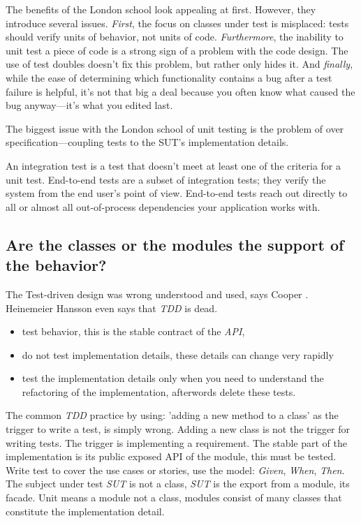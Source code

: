 \documentclass{article}
\begin{document}
The benefits of the London school look appealing at first. However, they introduce several issues. \textit{First}, the focus on classes under test is misplaced: tests should verify units of behavior, not units of code. \textit{Furthermore}, the inability to unit test a piece of code is a strong sign of a problem with the code design. The use of test doubles doesn’t fix this problem, but rather only hides it. And \textit{finally}, while the ease of determining which functionality contains a bug after a test failure is helpful, it’s not that big a deal because you often know what caused the bug anyway—it’s what you edited last.

The biggest issue with the London school of unit testing is the problem of over specification—coupling tests to the SUT’s implementation details.

An integration test is a test that doesn’t meet at least one of the criteria for a unit test. End-to-end tests are a subset of integration tests; they verify the system from the end user’s point of view. End-to-end tests reach out directly to all or almost all out-of-process dependencies your application works with.


\subsection{Are the classes or the modules the support of the behavior?}

The Test-driven design \cite{beck2002driven} was wrong understood and used, says Cooper \cite{WEBSITE:WhereDidItAllGoWrong}. Heinemeier Hansson \cite{WEBSITE:TDDisdead} even says that \textit{TDD} is dead.

\begin{itemize}
	\item test behavior, this is the stable contract of the \textit{API}, 
	\item do not test implementation details, these details can change very rapidly
	\item test the implementation details only when you need to understand the refactoring of the implementation, afterwords delete these tests.
\end{itemize}

The common \textit{TDD} practice by using: 'adding a new method to a class' as the trigger to write a test, is simply wrong. Adding a new class is not the trigger for writing tests. The trigger is implementing a requirement.
The stable part of the implementation is its public exposed API of the module, this must be tested. Write test to cover the use cases or stories, use the model: \textit{Given}, \textit{When}, \textit{Then}. The subject under test \textit{SUT} is not a class, \textit{SUT} is the export from a module, its facade.
Unit means a module not a class, modules consist of many classes that constitute the implementation detail.
\end{document}
